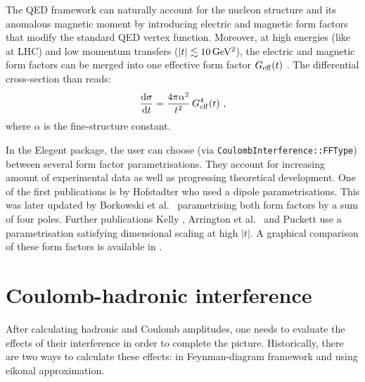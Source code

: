 \documentclass[preprint,12pt]{elsarticle}
\def\d{{\rm d}}
\def\un#1{{\,\rm #1}}
\begin{document}
The QED framework can naturally account for the nucleon structure and its anomalous magnetic moment by introducing electric and magnetic form factors that modify the standard QED vertex function. Moreover, at high energies (like at LHC) and low momentum transfers ($|t| \lesssim 10\un{GeV^2}$), the electric and magnetic form factors can be merged into one effective form factor $G_{\rm eff}(t)$ \cite[equation (31)]{block06}. The differential cross-section than reads:
\begin{equation}
{\d\sigma\over\d t} = {4\pi \alpha^2\over t^2}\, G_{\rm eff}^4(t)\ ,
\end{equation}
where $\alpha$ is the fine-structure constant.

In the Elegent package, the user can choose (via {\tt CoulombInterference::FFType}) between several form factor parametrisations. They account for increasing amount of experimental data as well as progressing theoretical development. One of the first publications is by Hofstadter \cite{hofstadter58} who used a dipole parametrisations. This was later updated by Borkowski et al.~\cite{borkowski74,borkowski75} parametrising both form factors by a sum of four poles. Further publications Kelly \cite{kelly04}, Arrington et al.~\cite{arrington07} and Puckett \cite{puckett10} use a parametrisation satisfying dimensional scaling at high $|t|$. A graphical comparison of these form factors is available in \cite[Figure~1.7]{jan_thesis}.




\section{Coulomb-hadronic interference}\label{s:int mod}

After calculating hadronic and Coulomb amplitudes, one needs to evaluate the effects of their interference in order to complete the picture. Historically, there are two ways to calculate these effects: in Feynman-diagram framework and using eikonal approximation.
\end{document}

